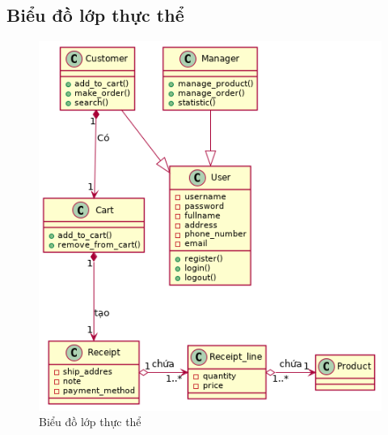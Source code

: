 \subsection{Biểu đồ lớp thực thể}
    \begin{figure}[h!]
        \centering
        \includegraphics[scale=0.7]{fig/class.png}
        \caption{Biểu đồ lớp thực thể}
    \end{figure}
\newpage
